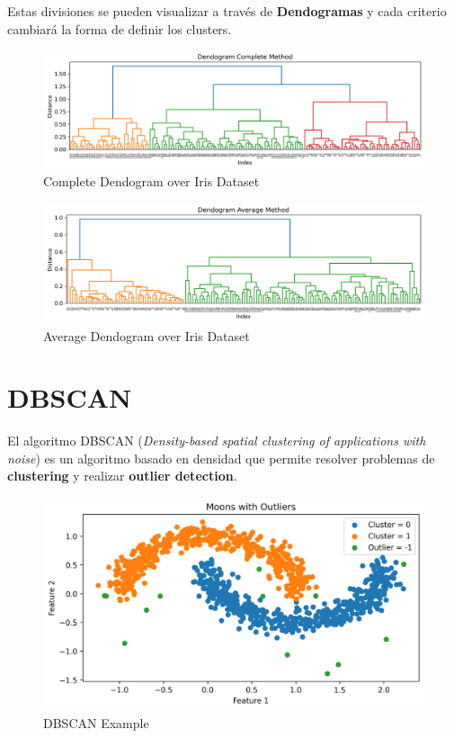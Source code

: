 Estas divisiones se pueden visualizar a través de \textbf{Dendogramas} y cada criterio cambiará la forma de definir los clusters.

\begin{figure}[H]
    \center
    \includegraphics[scale=0.5]{notebooks/ML/img/complete_dendogram_iris.png}
    \caption{Complete Dendogram over Iris Dataset}
\end{figure}

\begin{figure}[H]
    \center
    \includegraphics[scale=0.5]{notebooks/ML/img/average_dendogram_iris.png}
    \caption{Average Dendogram over Iris Dataset}
\end{figure}

\section{DBSCAN}

El algoritmo DBSCAN (\textit{Density-based spatial clustering of applications with noise}) es un algoritmo basado en densidad que permite resolver problemas de \textbf{clustering} y realizar \textbf{outlier detection}. 

\begin{figure}[H]
    \center
    \includegraphics[scale=0.5]{notebooks/ML/img/dbscan_on_moons.png}
    \caption{DBSCAN Example}
\end{figure}

